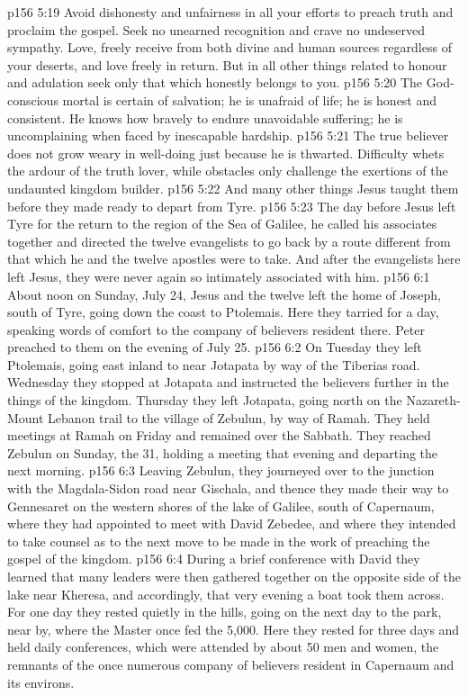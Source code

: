 \vs p156 5:19 Avoid dishonesty and unfairness in all your efforts to preach truth and proclaim the gospel. Seek no unearned recognition and crave no undeserved sympathy. Love, freely receive from both divine and human sources regardless of your deserts, and love freely in return. But in all other things related to honour and adulation seek only that which honestly belongs to you.
\vs p156 5:20 The God\hyp{}conscious mortal is certain of salvation; he is unafraid of life; he is honest and consistent. He knows how bravely to endure unavoidable suffering; he is uncomplaining when faced by inescapable hardship.
\vs p156 5:21 The true believer does not grow weary in well\hyp{}doing just because he is thwarted. Difficulty whets the ardour of the truth lover, while obstacles only challenge the exertions of the undaunted kingdom builder.
\vs p156 5:22 \pc And many other things Jesus taught them before they made ready to depart from Tyre.
\vs p156 5:23 The day before Jesus left Tyre for the return to the region of the Sea of Galilee, he called his associates together and directed the twelve evangelists to go back by a route different from that which he and the twelve apostles were to take. And after the evangelists here left Jesus, they were never again so intimately associated with him.
\vs p156 6:1 About noon on Sunday, July 24, Jesus and the twelve left the home of Joseph, south of Tyre, going down the coast to Ptolemais. Here they tarried for a day, speaking words of comfort to the company of believers resident there. Peter preached to them on the evening of July 25.
\vs p156 6:2 On Tuesday they left Ptolemais, going east inland to near Jotapata by way of the Tiberias road. Wednesday they stopped at Jotapata and instructed the believers further in the things of the kingdom. Thursday they left Jotapata, going north on the Nazareth\hyp{}Mount Lebanon trail to the village of Zebulun, by way of Ramah. They held meetings at Ramah on Friday and remained over the Sabbath. They reached Zebulun on Sunday, the 31, holding a meeting that evening and departing the next morning.
\vs p156 6:3 Leaving Zebulun, they journeyed over to the junction with the Magdala\hyp{}Sidon road near Gischala, and thence they made their way to Gennesaret on the western shores of the lake of Galilee, south of Capernaum, where they had appointed to meet with David Zebedee, and where they intended to take counsel as to the next move to be made in the work of preaching the gospel of the kingdom.
\vs p156 6:4 During a brief conference with David they learned that many leaders were then gathered together on the opposite side of the lake near Kheresa, and accordingly, that very evening a boat took them across. For one day they rested quietly in the hills, going on the next day to the park, near by, where the Master once fed the 5,000. Here they rested for three days and held daily conferences, which were attended by about 50 men and women, the remnants of the once numerous company of believers resident in Capernaum and its environs.
